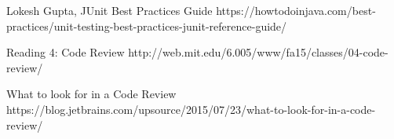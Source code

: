 \documentclass[10pt]{article}
\begin{document}
\newpage
  
% 
\begin{thebibliography}{1}
	
\bibitem{}
Lokesh Gupta, JUnit Best Practices Guide
\newblock https://howtodoinjava.com/best-practices/unit-testing-best-practices-junit-reference-guide/
	
\bibitem{}
Reading 4: Code Review
\newblock http://web.mit.edu/6.005/www/fa15/classes/04-code-review/
	
\bibitem{}
What to look for in a Code Review
\newblock https://blog.jetbrains.com/upsource/2015/07/23/what-to-look-for-in-a-code-review/

\end{thebibliography}
\end{document}
